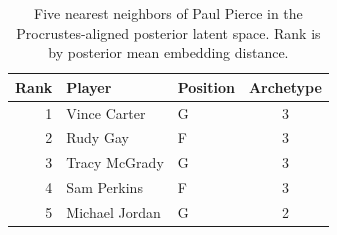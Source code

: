 \begin{table}[htbp]
  \centering\small
  \begin{tabular}{rllc}
    \toprule
    Rank & Player & Position & Archetype \\
    \midrule
    1 & Vince Carter & G & 3 \\
    2 & Rudy Gay & F & 3 \\
    3 & Tracy McGrady & G & 3 \\
    4 & Sam Perkins & F & 3 \\
    5 & Michael Jordan & G & 2 \\
    \bottomrule
  \end{tabular}
  \caption{Five nearest neighbors of Paul Pierce in the Procrustes-aligned posterior latent space. Rank is by posterior mean embedding distance.}
  \label{tab:Paul_Pierce_neighbors}
\end{table}

